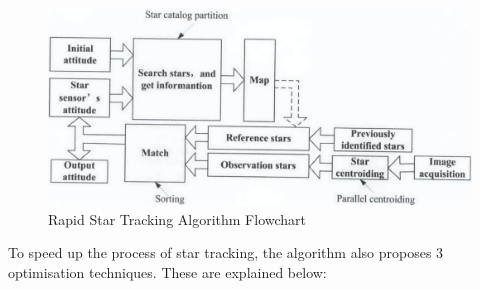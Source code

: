 \documentclass[../../main.tex]{subfiles}
\begin{document}
\begin{figure}[!h]
        \centering
        \includegraphics[scale=0.4]{Figures/GNC/rapid_tracking_flowchart.png}
        \caption{Rapid Star Tracking Algorithm Flowchart}
        \label{fig:rapid_tracking_flowchart}
\end{figure}
To speed up the process of star tracking, the algorithm also proposes 3 optimisation techniques. These are explained below:
\end{document}
